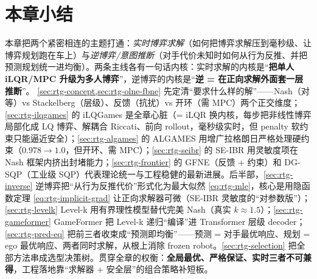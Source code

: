 \section*{本章小结}

本章把两个紧密相连的主题打通：\emph{实时博弈求解}（如何把博弈求解压到毫秒级、让博弈规划跑在车上）与\emph{逆博弈/意图推断}（对手代价未知时如何从行为反推、并把预测规划统一进均衡）。两条主线各有一句话内核：实时求解的内核是“\textbf{把单人 iLQR/MPC 升级为多人博弈}”，逆博弈的内核是“\textbf{逆 = 在正向求解外面套一层推断}”。
\cref{sec:rtg-concept,sec:rtg-olne-fbne} 先定清“要求什么样的解”——Nash（对等）vs Stackelberg（层级）、反馈（抗扰）vs 开环（需 MPC）两个正交维度；\cref{sec:rtg-ilqgames} 的 iLQGames 是全章心脏（= iLQR 换内核，每步把非线性博弈局部化成 LQ 博弈、解耦合 Riccati、前向 rollout，毫秒级实时，但 penalty 软约束只能逼近安全）；\cref{sec:rtg-algames} 的 ALGAMES 用增广拉格朗日严格处理硬约束（$0.978\to1.0$，但开环、需 MPC）；\cref{sec:rtg-seibr} 的 SE-IBR 用灵敏度项在 Nash 框架内挤出封堵能力；\cref{sec:rtg-frontier} 的 GFNE（反馈 + 约束）和 DG-SQP（工业级 SQP）代表理论统一与工程稳健的最新进展。后半部，\cref{sec:rtg-inverse} 逆博弈把“从行为反推代价”形式化为最大似然 \cref{eq:rtg-mle}，核心是用隐函数定理 \cref{eq:rtg-implicit-grad} 让正向求解器可微（SE-IBR 灵敏度的“对参数版”）；\cref{sec:rtg-levelk} Level-k 用有界理性模型替代完美 Nash（真实 $k\approx1.5$）；\cref{sec:rtg-gameformer} GameFormer 把 Level-k 递归“编译”进 Transformer 层级 decoder；\cref{sec:rtg-pred-eq} 把前三者收束成“预测即均衡”——预测 = 对手最优响应、规划 = ego 最优响应、两者同时求解，从根上消除 frozen robot。\cref{sec:rtg-selection} 把全部方法串成选型决策树。贯穿全章的权衡：\textbf{全局最优、严格保证、实时三者不可兼得}，工程落地靠“求解器 + 安全层”的组合策略补短板。


